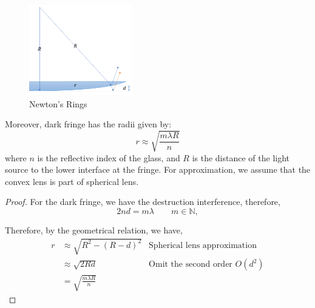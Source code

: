 \documentclass[UTF8]{book}
\begin{document}
\begin{figure}
  \vspace{-20pt}  
  \begin{center}
    \includegraphics[width=0.4\textwidth]{Figure/21.PNG}
  \end{center}  
  \vspace{-20pt}  
  \caption{Newton's Rings}
  \label{fig:21}
\end{figure}
Moreover, dark fringe has the radii given by: 
\[r \approx \sqrt{\frac{m\lambda R}{n}}\]
where $n$ is the reflective index of the glass, and $R$ is the distance of the light source to the lower interface at the fringe. For approximation, we assume that the convex lens is part of spherical lens.

\begin{proof}
For the dark fringe, we have the destruction interference, therefore, 
\[2nd=m\lambda \qquad m\in \mathbb{N},\]

Therefore, by the geometrical relation, we have,
\begin{align*}
r&\approx\sqrt{R^2-\left(R-d\right)^2} &\textrm{Spherical lens approximation}\\
&\approx \sqrt{2Rd}&\textrm{Omit the second order }O(d^2)\\
&=\sqrt{\frac{m\lambda R}{n}}&~
\end{align*}
\end{proof}
\end{document}
